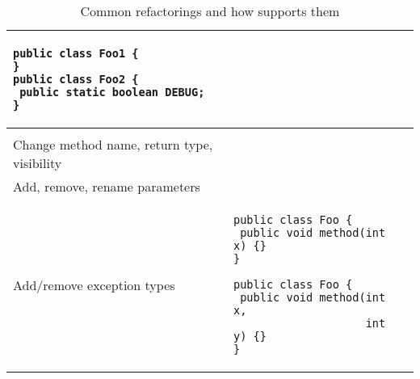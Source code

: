 \begin{table}
\begin{center}
\begin{tabular}[t]{@{}l|l|l@{}}
\begin{minipage}[t]{\MiddleColumnWidth}
\begin{verbatim}
public class Foo1 {
}
public class Foo2 {
 public static boolean DEBUG;
}
\end{verbatim}
\end{minipage} & \\ \hline

\begin{minipage}[t]{\LeftColumnWidth}
{\bf Change method signature} \\
Change method name, return type, visibility \\
Add, remove, rename parameters \\
Add/remove exception types
\end{minipage} &
\begin{minipage}[t]{\MiddleColumnWidth}
\begin{verbatim}
public class Foo {
 public void method(int x) {}
}

public class Foo {
 public void method(int x,
                    int y) {}
}
\end{verbatim}
\end{minipage} & \\ \hline

\end{tabular}
\caption{Common refactorings and how \DSU{} supports them\label{tab:catchup}}
\end{center}
\end{table}


